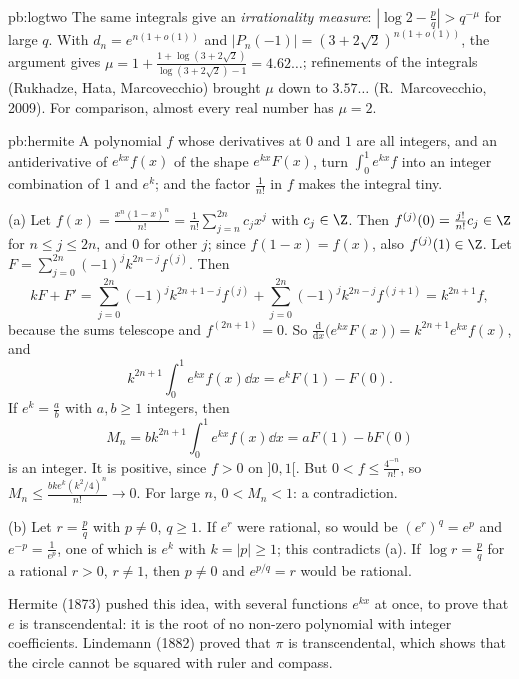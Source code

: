 \begin{solution}{pb:logtwo}
\leads The same integrals give an \emph{irrationality measure}: $|\log2-\frac pq|>q^{-\mu}$ for large $q$. With $d_n=e^{n(1+o(1))}$ and
$|P_n(-1)|=(3+2\sqrt2)^{n(1+o(1))}$, the argument gives $\mu=1+\frac{1+\log(3+2\sqrt2)}{\log(3+2\sqrt2)-1}=4.62\ldots$; refinements of the integrals (Rukhadze, Hata, Marcovecchio) brought $\mu$ down to $3.57\ldots$ (R.~Marcovecchio,
2009). For comparison, almost every real number has $\mu=2$.
\end{solution}

\begin{solution}{pb:hermite}
\idea A polynomial $f$ whose derivatives at $0$ and $1$ are all integers, and an antiderivative of $e^{kx}f(x)$ of the shape $e^{kx}F(x)$,
turn $\int_0^1e^{kx}f$ into an integer combination of $1$ and $e^k$; and the factor $\frac1{n!}$ in $f$ makes the integral tiny.

\writeup (a) Let $f(x)=\frac{x^n(1-x)^n}{n!}=\frac1{n!}\sum_{j=n}^{2n}c_jx^j$ with $c_j\in\Z$. Then $f^{(j)}(0)=\frac{j!}{n!}c_j\in\Z$ for $n\le j\le2n$, and $0$ for
other $j$; since $f(1-x)=f(x)$, also $f^{(j)}(1)\in\Z$. Let $F=\sum_{j=0}^{2n}(-1)^jk^{2n-j}f^{(j)}$. Then
\[
kF+F'=\sum_{j=0}^{2n}(-1)^jk^{2n+1-j}f^{(j)}+\sum_{j=0}^{2n}(-1)^jk^{2n-j}f^{(j+1)}=k^{2n+1}f,
\]
because the sums telescope and $f^{(2n+1)}=0$. So $\frac{\mathrm d}{\mathrm dx}\bigl(e^{kx}F(x)\bigr)=k^{2n+1}e^{kx}f(x)$, and
\[
k^{2n+1}\int_0^1e^{kx}f(x)\dd x=e^kF(1)-F(0).
\]
If $e^k=\frac ab$ with $a,b\ge1$ integers, then
\[
M_n=bk^{2n+1}\int_0^1e^{kx}f(x)\dd x=aF(1)-bF(0)
\]
is an integer. It is positive, since
$f>0$ on $]0,1[$. But $0<f\le\frac{4^{-n}}{n!}$, so $M_n\le\frac{bk e^k(k^2/4)^n}{n!}\to0$. For large $n$, $0<M_n<1$: a contradiction.

(b) Let $r=\frac pq$ with $p\ne0$, $q\ge1$. If $e^r$ were rational, so would be $(e^r)^q=e^p$ and $e^{-p}=\frac1{e^p}$, one of which is $e^k$
with $k=|p|\ge1$; this contradicts (a). If $\log r=\frac pq$ for a rational $r>0$, $r\ne1$, then $p\ne0$ and $e^{p/q}=r$ would be
rational.

\leads Hermite (1873) pushed this idea, with several functions $e^{kx}$ at once, to prove that $e$ is transcendental: it is the root of
no non-zero polynomial with integer coefficients. Lindemann (1882) proved that $\pi$ is transcendental, which shows that the circle
cannot be squared with ruler and compass.
\end{solution}

